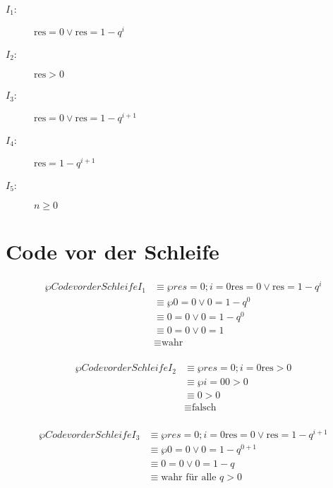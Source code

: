 \documentclass{lehramt-informatik-aufgabe}
\begin{document}

\begin{description}
\item[$I_1$:] $\text{res} = 0 \lor \text{res} = 1 - q^i$

\item[$I_2$:] $\text{res} > 0$

\item[$I_3$:] $\text{res} = 0 \lor \text{res} = 1 - q^{i+1}$

\item[$I_4$:] $\text{res} = 1 - q^{i+1}$

\item[$I_5$:] $n \geq 0$
\end{description}

\section{Code vor der Schleife}

\begin{align*}
\wp{Code vor der Schleife}{I_1}
& \equiv \wp{res = 0; i = 0}{\text{res} = 0 \lor \text{res} = 1 - q^i} \\
& \equiv \wp{}{0 = 0 \lor 0 = 1 - q^0} \\
& \equiv 0 = 0 \lor 0 = 1 - q^0 \\
& \equiv 0 = 0 \lor 0 = 1 \\
& \equiv \text{wahr} \\
\end{align*}

\begin{align*}
\wp{Code vor der Schleife}{I_2}
& \equiv \wp{res = 0; i = 0}{\text{res} > 0} \\
& \equiv \wp{i = 0}{0 > 0} \\
& \equiv 0 > 0 \\
& \equiv \text{falsch} \\
\end{align*}

\begin{align*}
\wp{Code vor der Schleife}{I_3}
& \equiv \wp{res = 0; i = 0}{\text{res} = 0 \lor \text{res} = 1 - q^{i+1}} \\
& \equiv \wp{}{0 = 0 \lor 0 = 1 - q^{0+1}} \\
& \equiv 0 = 0 \lor 0 = 1 - q \\
& \equiv \text{wahr für alle } q > 0\\
\end{align*}
\end{document}
